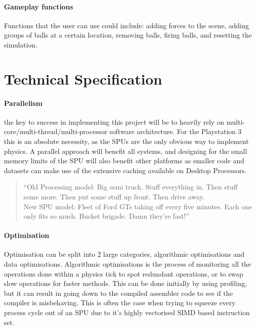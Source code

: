\documentclass[conference]{acmsiggraph}
\begin{document}
\paragraph{Gameplay functions}
Functions that the user can use could include: adding forces to the scene, adding groups of balls at a certain location, removing balls, firing balls, and resetting the simulation.

\section{Technical Specification}

\paragraph{Parallelism}
the key to success in implementing this project will be to heavily rely on multi-core/multi-thread/multi-processor software architecture. For the Playstation 3 this is an absolute necessity, as the SPUs are the only obvious way to implement physics. A parallel approach will benefit all systems, and designing for the small memory limits of the SPU will also benefit other platforms as smaller code and datasets can make use of the extensive caching available on Desktop Processors.

\begin{quote}
``Old Processing model: Big semi truck. Stuff everything in. Then stuff some
more. Then put some stuff up front. Then drive
away.\\
New SPU model: Fleet of Ford GTs taking off every five minutes.
Each one only fits so much. Bucket brigade. Damn they're fast!''
 \cite{spuspeed}
\end{quote}

\paragraph{Optimisation}
Optimisation can be split into 2 large categories, algorithmic optimisations and data optimisations. Algorithmic optimisations is the process of monitoring all the operations done within a physics tick to spot redundant operations, or to swap slow operations for faster methods. This can be done initially by using profiling, but it can result in going down to the compiled assembler code to see if the compiler is misbehaving. This is often the case when trying to squeeze every process cycle out of an SPU due to it's highly vectorised SIMD based instruction set.
\end{document}
